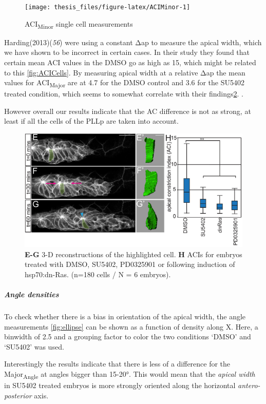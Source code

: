 \documentclass[11pt,singlespacinge,twoside]{reedthesis} %
\begin{document}
\begin{figure}

{\centering \texttt{[image: thesis\_files/figure-latex/ACIMinor-1]} 

}

\caption{ACI\textsubscript{Minor} single cell measurements}\label{fig:ACIMinor}
\end{figure}
Harding(2013)(\emph{56}) were using a constant \(\mathrm{\Delta}\)ap to measure the apical width, which we have shown to be incorrect in certain cases. In their study they found that certain mean ACI values in the DMSO go as high as 15, which might be related to this \ref{fig:ACICells}.
By measuring apical width at a relative \(\mathrm{\Delta}\)ap the mean values for ACI\textsubscript{Major} are at 4.7 for the DMSO control and 3.6 for the SU5402 treated condition, which seems to somewhat correlate with their findings\ref{fig:HardingACI}. .

However overall our results indicate that the AC difference is not as strong, at least if all the cells of the PLLp are taken into account.


\begin{figure}

{\centering \includegraphics[width=0.6\linewidth]{figure/02-MaMo/GrTr/HardingACI} 

}

\caption[Published ACI]{\textbf{E-G} 3-D reconstructions of the highlighted cell. \textbf{H} ACIs for embryos treated with DMSO, SU5402, PD0325901 or following induction of hsp70:dn-Ras. (n=180 cells / N = 6 embryos).}\label{fig:HardingACI}
\end{figure}
\hypertarget{ACI-Angledens}{%
\subparagraph{Angle densities}\label{ACI-Angledens}}

To check whether there is a bias in orientation of the apical width, the angle measurements \ref{fig:ellipse} can be shown as a function of density along X. Here, a binwidth of 2.5 and a grouping factor to color the two conditions `DMSO' and `SU5402' was used.

\noindent Interestingly the results indicate that there is less of a difference for the Major\textsubscript{Angle} at angles bigger than 15-20°. This would mean that the \emph{apical width} in SU5402 treated embryos is more strongly oriented along the horizontal \emph{antero-posterior} axis.
\end{document}
